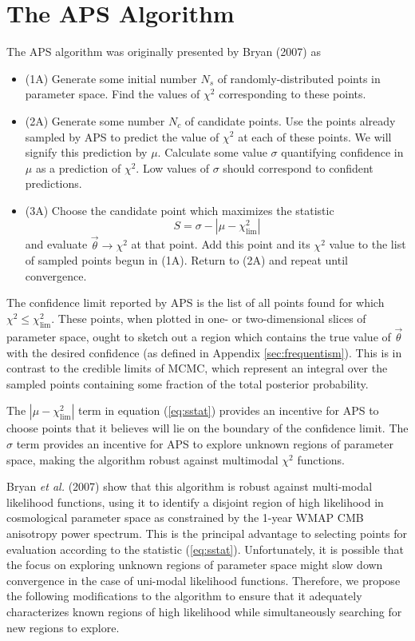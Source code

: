 \documentclass[useAMS,usenatbib]{aastex}
\begin{document}
\section{The APS Algorithm}
\label{sec:algorithm}

The APS algorithm was originally presented by Bryan (2007) as

\begin{itemize}
\item(1A) Generate some initial number $N_s$ of randomly-distributed points in 
parameter space.  Find the values of $\chi^2$ corresponding to these points.
\\
\item(2A) Generate some number $N_c$ of candidate points.  Use the points
already sampled by APS to predict the value of $\chi^2$ at each of these points.
 We will signify this prediction by $\mu$.  Calculate some value $\sigma$
 quantifying confidence in $\mu$ as a prediction of $\chi^2$.  Low values of
 $\sigma$ should correspond to confident predictions.
 \\
\item(3A) Choose the candidate point which maximizes the statistic
\begin{equation}
\label{eq:sstat}
S=\sigma-|\mu-\chi^2_\text{lim}|
\end{equation}
and evaluate $\vec{\theta}\rightarrow\chi^2$ at that point.  Add this point and
its $\chi^2$ value to the list of sampled points begun in (1A). 
Return to (2A) and repeat until convergence.
\\
\end{itemize}
The confidence limit reported by APS is the list of all points found
for which $\chi^2\le\chi^2_\text{lim}$.  
These points, when plotted in one- or two-dimensional slices of parameter
space, ought to sketch out a region which contains the true value of $\vec{\theta}$
with the desired confidence (as defined in Appendix \ref{sec:frequentism}).
This is in contrast to the credible
limits of MCMC, which represent an integral over the sampled points containing some
fraction of the total posterior probability.

The $|\mu-\chi^2_\text{lim}|$ term in equation (\ref{eq:sstat}) provides an
incentive for APS to choose points that it believes will lie on the boundary of
the confidence limit.  
The $\sigma$ term provides an incentive for APS to explore unknown regions of
parameter space, making the algorithm robust against multimodal $\chi^2$
functions.  

Bryan {\it et al.} (2007) show that this algorithm is robust against multi-modal
likelihood functions, using it to identify a disjoint region of high likelihood in
cosmological parameter space as constrained by the 1-year WMAP CMB anisotropy power
spectrum.  This is the principal advantage to selecting points for evaluation according
to the statistic (\ref{eq:sstat}).  Unfortunately, it is possible that the focus on exploring
unknown regions of parameter space might slow down convergence in the case of uni-modal
likelihood functions.  Therefore, we propose the following modifications to the algorithm
to ensure that it adequately characterizes known regions of high likelihood while
simultaneously searching for new regions to explore.
\end{document}
